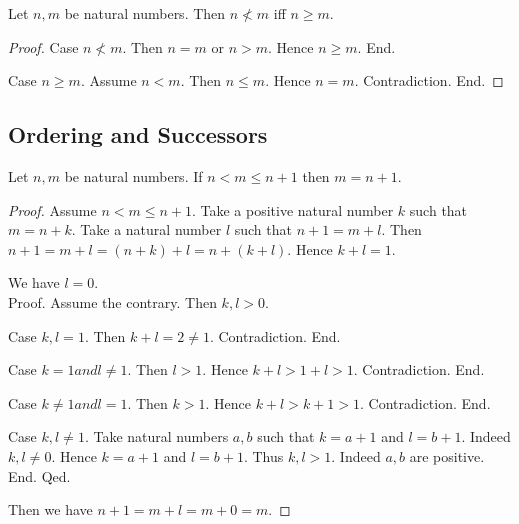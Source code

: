 \documentclass[10pt]{article}
\begin{document}
  \begin{forthel}
    \begin{proposition}
      Let $n, m$ be natural numbers.
      Then $n \nless m$ iff $n \geq m$.
    \end{proposition}
    \begin{proof}
      Case $n \nless m$.
        Then $n = m$ or $n > m$.
        Hence $n \geq m$.
      End.

      Case $n \geq m$.
        Assume $n < m$.
        Then $n \leq m$.
        Hence $n = m$.
        Contradiction.
      End.
    \end{proof}
  \end{forthel}


  \subsection*{Ordering and Successors}

  \begin{forthel}
    \begin{proposition}
      Let $n, m$ be natural numbers.
      If $n < m \leq n + 1$ then $m = n + 1$.
    \end{proposition}
    \begin{proof}
      Assume $n < m \leq n + 1$.
      Take a positive natural number $k$ such that $m = n + k$.
      Take a natural number $l$ such that $n + 1 = m + l$.
      Then $n + 1
        = m + l
        = (n + k) + l
        = n + (k + l)$.
      Hence $k + l = 1$.

      We have $l = 0$. \\
      Proof.
        Assume the contrary.
        Then $k,l > 0$.

        Case $k,l = 1$.
          Then $k + l
            = 2
            \neq 1$.
          Contradiction.
        End.

        Case $k = 1 and l \neq 1$.
          Then $l > 1$.
          Hence $k + l
            > 1 + l
            > 1$.
          Contradiction.
        End.

        Case $k \neq 1 and l = 1$.
          Then $k > 1$.
          Hence $k + l
            > k + 1
            > 1$.
          Contradiction.
        End.

        Case $k, l \neq 1$.
          Take natural numbers $a, b$ such that $k = a + 1$ and $l = b + 1$.
          Indeed $k, l \neq 0$.
          Hence $k = a + 1$ and $l = b + 1$.
          Thus $k, l > 1$. Indeed $a, b$ are positive.
        End.
      Qed.

      Then we have $n + 1
        = m + l
        = m + 0
        = m$.
    \end{proof}
  \end{forthel}
\end{document}
